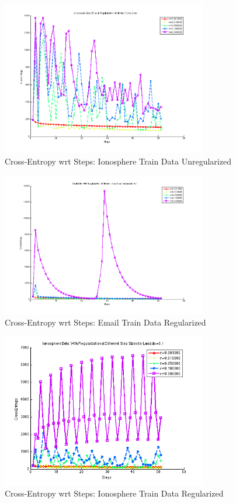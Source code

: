\documentclass[paper=a4, fontsize=11pt]{scrartcl} %
\numberwithin{equation}{section} %
\numberwithin{figure}{section} %
\numberwithin{table}{section} %
\begin{document}
\begin{figure}[h!]
  \caption{Cross-Entropy wrt Steps: Ionosphere Train Data Unregularized}
  \centering
    \includegraphics[width=0.8\textwidth]{../Pics/Fig2_iono_unreg.png}
\end{figure}


\begin{figure}[h!]
  \caption{Cross-Entropy wrt Steps: Email Train Data Regularized}
  \centering
    \includegraphics[width=0.8\textwidth]{../Pics/Fig3_email_reg.png}
\end{figure}

\begin{figure}[h!]
  \caption{Cross-Entropy wrt Steps: Ionosphere Train Data Regularized}
  \centering
    \includegraphics[width=0.8\textwidth]{../Pics/Fig4_iono_reg.png}
\end{figure}
\end{document}
